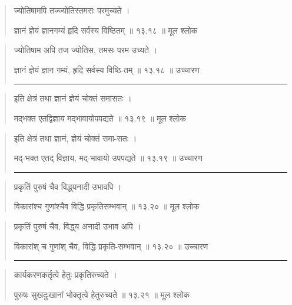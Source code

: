 \begin{quotation}

ज्योतिषामपि तज्ज्योतिस्तमसः परमुच्यते  ।  

ज्ञानं ज्ञेयं ज्ञानगम्यं हृदि सर्वस्य विष्ठितम्‌  ॥ १३.१८ ॥  मूल श्लोक
\end{quotation}

\begin{quotation}

ज्योतिषाम अपि तज ज्योतिस,  तमसः परम उच्यते  ।  

ज्ञानं ज्ञेयं ज्ञान गम्यं, हृदि सर्वस्य विष्ठि-तम्‌  ॥ १३.१८ ॥  उच्चारण

\noindent\rule{16cm}{0.4pt} 
\end{quotation}


\begin{quotation}

इति क्षेत्रं तथा ज्ञानं ज्ञेयं चोक्तं समासतः  ।  

मद्भक्त एतद्विज्ञाय मद्भावायोपपद्यते  ॥ १३.१९ ॥  मूल श्लोक
\end{quotation}

\begin{quotation}

इति क्षेत्रं तथा ज्ञानं, ज्ञेयं चोक्तं समा-सतः  ।  

मद्-भक्त एतद् विज्ञाय, मद्-भावायो उपपद्यते  ॥ १३.१९ ॥  उच्चारण

\noindent\rule{16cm}{0.4pt} 
\end{quotation}


\begin{quotation}

प्रकृतिं पुरुषं चैव विद्ध्‌यनादी उभावपि  ।  

विकारांश्च गुणांश्चैव विद्धि प्रकृतिसम्भवान्‌  ॥ १३.२० ॥  मूल श्लोक
\end{quotation}

\begin{quotation}

प्रकृतिं पुरुषं चैव, विद्ध्‌य अनादी उभाव अपि  ।  

विकारांश् च गुणांश् चैव, विद्धि प्रकृति-सम्भवान्‌  ॥ १३.२० ॥  उच्चारण

\noindent\rule{16cm}{0.4pt} 
\end{quotation}


\begin{quotation}

कार्यकरणकर्तृत्वे हेतुः प्रकृतिरुच्यते  ।  

पुरुषः सुखदुःखानां भोक्तृत्वे हेतुरुच्यते  ॥ १३.२१ ॥  मूल श्लोक
\end{quotation}


